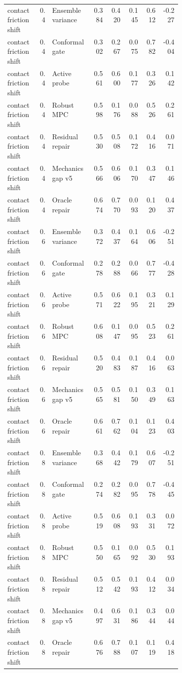 \documentclass{article}
\begin{document}
\begin{center}
\begin{longtable}{p{0.18\linewidth}rp{0.23\linewidth}rrrrr}
contact friction shift & 0.4 & Ensemble variance & 0.384 & 0.420 & 0.145 & 0.612 & -0.227\\
contact friction shift & 0.4 & Conformal gate & 0.302 & 0.267 & 0.075 & 0.782 & -0.404\\
contact friction shift & 0.4 & Active probe & 0.561 & 0.600 & 0.177 & 0.326 & 0.142\\
contact friction shift & 0.4 & Robust MPC & 0.598 & 0.176 & 0.088 & 0.526 & 0.261\\
contact friction shift & 0.4 & Residual repair & 0.530 & 0.508 & 0.172 & 0.416 & 0.071\\
contact friction shift & 0.4 & Mechanics gap v5 & 0.566 & 0.606 & 0.170 & 0.347 & 0.146\\
contact friction shift & 0.4 & Oracle repair & 0.674 & 0.770 & 0.093 & 0.120 & 0.437\\
contact friction shift & 0.6 & Ensemble variance & 0.372 & 0.437 & 0.164 & 0.606 & -0.251\\
contact friction shift & 0.6 & Conformal gate & 0.278 & 0.288 & 0.066 & 0.777 & -0.428\\
contact friction shift & 0.6 & Active probe & 0.571 & 0.622 & 0.195 & 0.321 & 0.129\\
contact friction shift & 0.6 & Robust MPC & 0.608 & 0.147 & 0.095 & 0.523 & 0.261\\
contact friction shift & 0.6 & Residual repair & 0.520 & 0.483 & 0.187 & 0.416 & 0.063\\
contact friction shift & 0.6 & Mechanics gap v5 & 0.565 & 0.581 & 0.150 & 0.349 & 0.163\\
contact friction shift & 0.6 & Oracle repair & 0.661 & 0.762 & 0.104 & 0.123 & 0.403\\
contact friction shift & 0.8 & Ensemble variance & 0.368 & 0.442 & 0.179 & 0.607 & -0.251\\
contact friction shift & 0.8 & Conformal gate & 0.274 & 0.282 & 0.095 & 0.778 & -0.445\\
contact friction shift & 0.8 & Active probe & 0.519 & 0.608 & 0.193 & 0.331 & 0.072\\
contact friction shift & 0.8 & Robust MPC & 0.550 & 0.165 & 0.092 & 0.530 & 0.193\\
contact friction shift & 0.8 & Residual repair & 0.512 & 0.542 & 0.193 & 0.412 & 0.034\\
contact friction shift & 0.8 & Mechanics gap v5 & 0.497 & 0.631 & 0.186 & 0.344 & 0.044\\
contact friction shift & 0.8 & Oracle repair & 0.676 & 0.788 & 0.107 & 0.119 & 0.418\\

\end{longtable}
\end{center}
\end{document}
